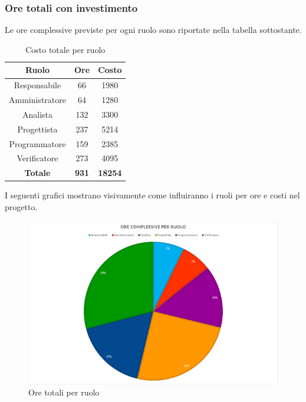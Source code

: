 \subsubsection{Ore totali con investimento}
Le ore complessive previste per ogni ruolo sono riportate nella tabella sottostante.
\begin{table}[H]
	\centering
	\begin{tabular}{|c|c|c|}
		\hline
		\textbf{Ruolo} &
		\textbf{Ore} &
		\textbf{Costo} \\
		\hline
		Responsabile & 66 & 1980\\
		\hline
		Amministratore & 64 & 1280\\
		\hline
		Analista & 132 & 3300\\
		\hline
		Progettista & 237 & 5214 \\
		\hline
		Programmatore & 159 & 2385 \\
		\hline
		Verificatore & 273 & 4095\\
		\hline
		\textbf{Totale} & \textbf{931} & \textbf{18254} \\
		\hline
	\end{tabular}
	\caption{Costo totale per ruolo}
\end{table}
I seguenti grafici mostrano visivamente come influiranno i ruoli per ore e costi nel progetto.
\begin{figure}[H]
	\centering
	\includegraphics[width=14cm]{img_peconomico/T_OR_C.png}
	\caption{Ore totali per ruolo}
\end{figure}
